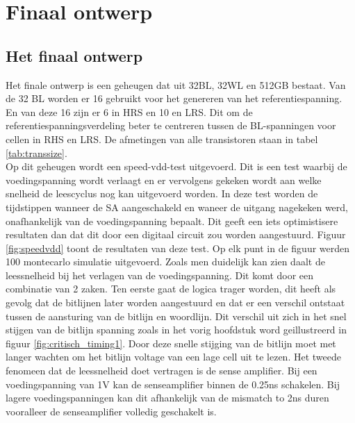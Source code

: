 \chapter{Finaal ontwerp}
\label{final}
\section{Het finaal ontwerp}
Het finale ontwerp is een geheugen dat uit 32BL, 32WL en 512GB bestaat. Van de 32 BL worden er 16 gebruikt voor het genereren van het referentiespanning. En van deze 16 zijn er 6 in HRS en 10 en LRS. Dit om de referentiespanningsverdeling beter te centreren tussen de BL-spanningen voor cellen in RHS en LRS. De afmetingen van alle transistoren staan in tabel \ref{tab:transsize}. \\
Op dit geheugen wordt een speed-vdd-test uitgevoerd. Dit is een test waarbij de voedingspanning wordt verlaagt en er vervolgens gekeken wordt aan welke snelheid de leescyclus nog kan uitgevoerd worden. In deze test worden de tijdstippen wanneer de SA aangeschakeld en waneer de uitgang nagekeken werd, onafhankelijk van de voedingspanning bepaalt. Dit geeft een iets optimistisere resultaten dan dat dit door een digitaal circuit zou worden aangestuurd. Figuur \ref{fig:speedvdd} toont de resultaten van deze test. Op elk punt in de figuur werden 100 montecarlo simulatie uitgevoerd. Zoals men duidelijk kan zien  daalt de leessnelheid bij het verlagen van de voedingspanning. Dit komt door een combinatie van 2 zaken. Ten eerste gaat de logica trager worden, dit heeft als gevolg dat de bitlijnen later worden aangestuurd en dat er een verschil ontstaat tussen de aansturing van de bitlijn en woordlijn. Dit verschil uit zich in het snel stijgen van de bitlijn spanning zoals in het vorig hoofdstuk word geillustreerd in figuur \ref{fig:critisch_timing1}. Door deze snelle stijging van de bitlijn moet met langer wachten om het bitlijn voltage van een lage cell uit te lezen. Het tweede fenomeen dat de leessnelheid doet vertragen is de sense amplifier. Bij een voedingspanning van 1V kan de senseamplifier binnen de 0.25ns schakelen. Bij lagere voedingspanningen kan dit afhankelijk van de mismatch to 2ns duren vooralleer de senseamplifier volledig geschakelt is.

